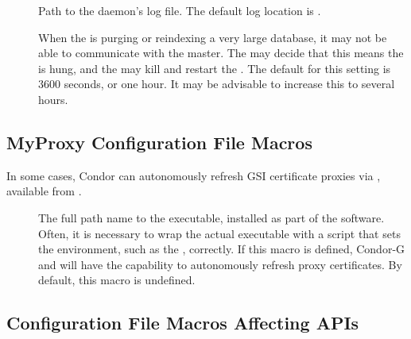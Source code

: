 \begin{description}
\item[] \label{param:DBMSDLog}
  Path to the  daemon's log file.
  The default log location is .

\item[]
  When the  is purging or reindexing a very large database, it 
  may not be able to communicate with the master. The  may
  decide that this means the  is hung, and the 
  may kill and restart the . 
  The default for this setting is 3600 seconds, or one hour. It may be
  advisable to increase this to several hours. 

\end{description}



\subsection{\label{sec:MyProxy-Config-File-Entries}MyProxy
Configuration File Macros}
 
In some cases, Condor can autonomously refresh GSI certificate proxies
via , available from
.

\begin{description}

\item[]
\label{param:MyProxyGetDelegation}  The full path name to the
 executable, installed as part of the
 software.  Often, it is necessary to wrap the actual
executable with a script that sets the environment, such as the
, correctly.  If this macro is defined,
Condor-G and  will have the capability to autonomously
refresh proxy certificates.  By default, this macro is undefined.

\end{description}

\subsection{\label{sec:API-Config-File-Entries}
Configuration File Macros Affecting APIs}

